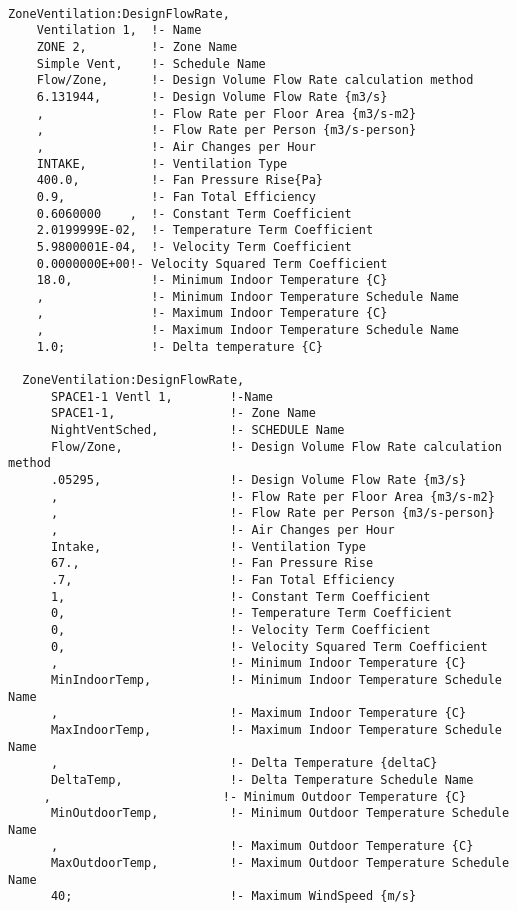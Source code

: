 \begin{lstlisting}

ZoneVentilation:DesignFlowRate,
    Ventilation 1,  !- Name
    ZONE 2,         !- Zone Name
    Simple Vent,    !- Schedule Name
    Flow/Zone,      !- Design Volume Flow Rate calculation method
    6.131944,       !- Design Volume Flow Rate {m3/s}
    ,               !- Flow Rate per Floor Area {m3/s-m2}
    ,               !- Flow Rate per Person {m3/s-person}
    ,               !- Air Changes per Hour
    INTAKE,         !- Ventilation Type
    400.0,          !- Fan Pressure Rise{Pa}
    0.9,            !- Fan Total Efficiency
    0.6060000    ,  !- Constant Term Coefficient
    2.0199999E-02,  !- Temperature Term Coefficient
    5.9800001E-04,  !- Velocity Term Coefficient
    0.0000000E+00!- Velocity Squared Term Coefficient
    18.0,           !- Minimum Indoor Temperature {C}
    ,               !- Minimum Indoor Temperature Schedule Name
    ,               !- Maximum Indoor Temperature {C}
    ,               !- Maximum Indoor Temperature Schedule Name
    1.0;            !- Delta temperature {C}

  ZoneVentilation:DesignFlowRate,
      SPACE1-1 Ventl 1,        !-Name
      SPACE1-1,                !- Zone Name
      NightVentSched,          !- SCHEDULE Name
      Flow/Zone,               !- Design Volume Flow Rate calculation method
      .05295,                  !- Design Volume Flow Rate {m3/s}
      ,                        !- Flow Rate per Floor Area {m3/s-m2}
      ,                        !- Flow Rate per Person {m3/s-person}
      ,                        !- Air Changes per Hour
      Intake,                  !- Ventilation Type
      67.,                     !- Fan Pressure Rise
      .7,                      !- Fan Total Efficiency
      1,                       !- Constant Term Coefficient
      0,                       !- Temperature Term Coefficient
      0,                       !- Velocity Term Coefficient
      0,                       !- Velocity Squared Term Coefficient
      ,                        !- Minimum Indoor Temperature {C}
      MinIndoorTemp,           !- Minimum Indoor Temperature Schedule Name
      ,                        !- Maximum Indoor Temperature {C}
      MaxIndoorTemp,           !- Maximum Indoor Temperature Schedule Name
      ,                        !- Delta Temperature {deltaC}
      DeltaTemp,               !- Delta Temperature Schedule Name
     ,                        !- Minimum Outdoor Temperature {C}
      MinOutdoorTemp,          !- Minimum Outdoor Temperature Schedule Name
      ,                        !- Maximum Outdoor Temperature {C}
      MaxOutdoorTemp,          !- Maximum Outdoor Temperature Schedule Name
      40;                      !- Maximum WindSpeed {m/s}
\end{lstlisting}

